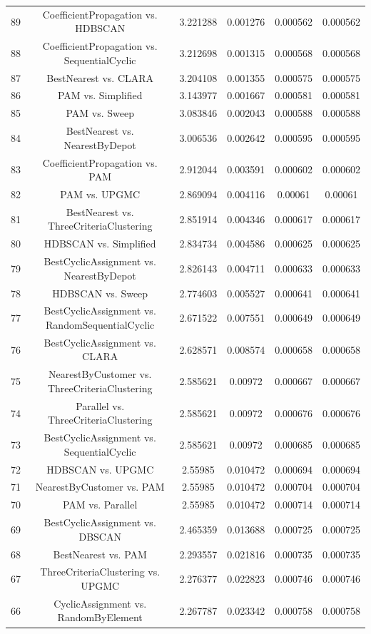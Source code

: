 \documentclass[a4paper,10pt]{article}
\begin{document}
\begin{landscape}
\begin{table}[!htp]
\begin{tabular}{cccccc}
89&CoefficientPropagation vs. HDBSCAN&3.221288&0.001276&0.000562&0.000562\\
88&CoefficientPropagation vs. SequentialCyclic&3.212698&0.001315&0.000568&0.000568\\
87&BestNearest vs. CLARA&3.204108&0.001355&0.000575&0.000575\\
86&PAM vs. Simplified&3.143977&0.001667&0.000581&0.000581\\
85&PAM vs. Sweep&3.083846&0.002043&0.000588&0.000588\\
84&BestNearest vs. NearestByDepot&3.006536&0.002642&0.000595&0.000595\\
83&CoefficientPropagation vs. PAM&2.912044&0.003591&0.000602&0.000602\\
82&PAM vs. UPGMC&2.869094&0.004116&0.00061&0.00061\\
81&BestNearest vs. ThreeCriteriaClustering&2.851914&0.004346&0.000617&0.000617\\
80&HDBSCAN vs. Simplified&2.834734&0.004586&0.000625&0.000625\\
79&BestCyclicAssignment vs. NearestByDepot&2.826143&0.004711&0.000633&0.000633\\
78&HDBSCAN vs. Sweep&2.774603&0.005527&0.000641&0.000641\\
77&BestCyclicAssignment vs. RandomSequentialCyclic&2.671522&0.007551&0.000649&0.000649\\
76&BestCyclicAssignment vs. CLARA&2.628571&0.008574&0.000658&0.000658\\
75&NearestByCustomer vs. ThreeCriteriaClustering&2.585621&0.00972&0.000667&0.000667\\
74&Parallel vs. ThreeCriteriaClustering&2.585621&0.00972&0.000676&0.000676\\
73&BestCyclicAssignment vs. SequentialCyclic&2.585621&0.00972&0.000685&0.000685\\
72&HDBSCAN vs. UPGMC&2.55985&0.010472&0.000694&0.000694\\
71&NearestByCustomer vs. PAM&2.55985&0.010472&0.000704&0.000704\\
70&PAM vs. Parallel&2.55985&0.010472&0.000714&0.000714\\
69&BestCyclicAssignment vs. DBSCAN&2.465359&0.013688&0.000725&0.000725\\
68&BestNearest vs. PAM&2.293557&0.021816&0.000735&0.000735\\
67&ThreeCriteriaClustering vs. UPGMC&2.276377&0.022823&0.000746&0.000746\\
66&CyclicAssignment vs. RandomByElement&2.267787&0.023342&0.000758&0.000758\\

\end{tabular}
\end{table}
\end{landscape}
\end{document}
